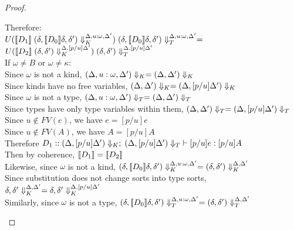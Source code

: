 \begin{proof}
\begin{enumerate}
\begin{itemize}
\begin{tabbedproof}
      \oooo Therefore:\\
      \ooox $U(\interp{D_1}\;\restricttyenv{\Delta, u:\omega, \Delta'}
                                           {(\delta, \interp{D_0}\delta, \delta')})
             \;\restrictvals{\Delta, u:\omega, \Delta'}{(\delta, \interp{D_0}\delta, \delta')}
             =$ \\
      \ooox $U(\interp{D_2}\;\restricttyenv{\Delta, [p/u]\Delta'}
                                           {(\delta, \delta')})
             \;\restrictvals{\Delta, [p/u]\Delta'}{(\delta, \delta')}$\\
      \ooo If $\omega \not= B$ or $\omega \not=\kappa$: \\
      \oooo Since $\omega$ is not a kind, $\restrictkind{\Delta, u:\omega, \Delta'} = 
                       \restrictkind{\Delta, \Delta'}$ \\
      \oooo Since kinds have no free variables, 
              $\restrictkind{\Delta, \Delta'} = \restrictkind{\Delta, [p/u]\Delta'}$ \\
      \oooo Since $\omega$ is not a type, 
              $\restricttype{\Delta, u:\omega, \Delta'} = \restricttype{\Delta, \Delta'}$ \\
      \oooo Since types have only type variables within them,
              $\restricttype{\Delta, \Delta'} = \restricttype{\Delta, [p/u]\Delta'}$ \\
      \oooo Since $u \not\in FV(e)$, we have $e = [p/u]e$ \\
      \oooo Since $u \not\in FV(A)$, we have $A = [p/u]A$ \\
      \oooo Therefore $D_1 :: \judgeE[\restrictkind{\Delta, [p/u]\Delta'}]{\restricttype{\Delta, [p/u]\Delta'}}{[p/u]e}{[p/u]A}$ \\
      \oooo Then by coherence, $\interp{D_1} = \interp{D_2}$ \\
      \oooo Likewise, since $\omega$ is not a kind, 
            $\restricttyenv{\Delta, u:\omega, \Delta'}{(\delta, \interp{D_0}\delta,\delta')} = 
             \restricttyenv{\Delta, \Delta'}{(\delta, \delta')}$ \\
      \oooo Since substitution does not change sorts into type sorts,
            $\restricttyenv{\Delta, \Delta'}{\delta, \delta'} = 
             \restricttyenv{\Delta, [p/u]\Delta'}{\delta, \delta'}$ \\
      \oooo Similarly, since $\omega$ is not a type,
            $\restrictvals{\Delta, u:\omega, \Delta'}{(\delta, \interp{D_0}\delta, \delta')} =
             \restrictvals{\Delta, \Delta'}{(\delta, \delta')}$ \\

\end{tabbedproof}
\end{itemize}
\end{enumerate}
\end{proof}
